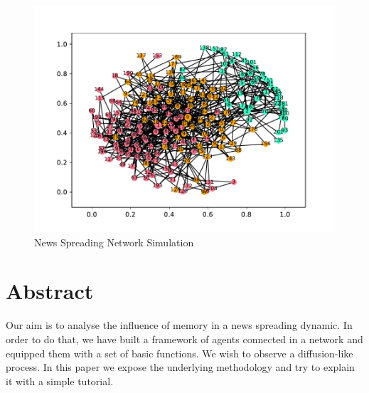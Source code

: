\begin{figure}[!h]
  \centering
  \includegraphics[trim={2.1cm 2cm 2cm 2cm}, clip, width=\columnwidth]{img/pdf/cover}
  \caption{News Spreading Network Simulation\protect\footnotemark}
  \label{fig:abstract}
\end{figure}
\section*{Abstract}\label{abstract}
Our aim is to analyse the influence of memory in a news spreading dynamic. In order to do that, we have built a framework of agents 
connected in a network and equipped them with a set of basic functions. We wish to observe a diffusion-like process.
In this paper we expose the underlying methodology and try to explain it with a simple tutorial.

